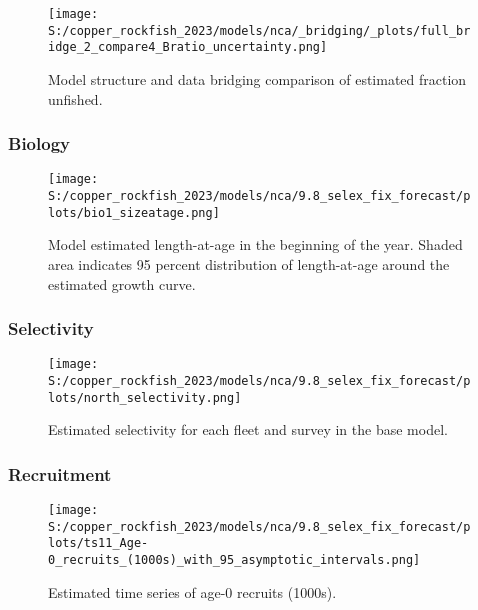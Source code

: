 \documentclass[11pt,
  english,
  letterpaper,
]{article}
\begin{document}
\pagebreak

\begin{figure}
\centering
\texttt{[image: S:/copper\_rockfish\_2023/models/nca/\_bridging/\_plots/full\_bridge\_2\_compare4\_Bratio\_uncertainty.png]}
\caption{Model structure and data bridging comparison of estimated fraction unfished.\label{fig:data-bridge-depl-2}}
\end{figure}

\pagebreak

\pagebreak

\hypertarget{biology-1}{%
\subsubsection{Biology}\label{biology-1}}

\begin{figure}
\centering
\texttt{[image: S:/copper\_rockfish\_2023/models/nca/9.8\_selex\_fix\_forecast/plots/bio1\_sizeatage.png]}
\caption{Model estimated length-at-age in the beginning of the year. Shaded area indicates 95 percent distribution of length-at-age around the estimated growth curve.\label{fig:mod-est-len-age}}
\end{figure}

\pagebreak

\hypertarget{selectivity}{%
\subsubsection{Selectivity}\label{selectivity}}

\begin{figure}
\centering
\texttt{[image: S:/copper\_rockfish\_2023/models/nca/9.8\_selex\_fix\_forecast/plots/north\_selectivity.png]}
\caption{Estimated selectivity for each fleet and survey in the base model.\label{fig:est-selex}}
\end{figure}

\pagebreak

\hypertarget{recruitment}{%
\subsubsection{Recruitment}\label{recruitment}}

\begin{figure}
\centering
\texttt{[image: S:/copper\_rockfish\_2023/models/nca/9.8\_selex\_fix\_forecast/plots/ts11\_Age-0\_recruits\_(1000s)\_with\_95\_asymptotic\_intervals.png]}
\caption{Estimated time series of age-0 recruits (1000s).\label{fig:recruits}}
\end{figure}
\end{document}
